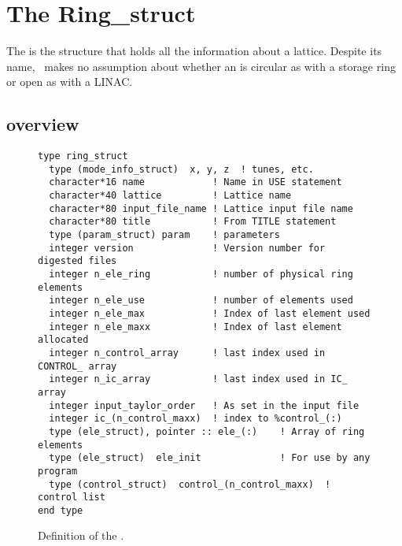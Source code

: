 \chapter{The Ring\_struct}
\label{c:ring_struct}

The  is the structure that holds all the information 
about a lattice.   Despite its name, \bmad\
makes no assumption about whether an  is circular as
with a storage ring or open as with a LINAC.

\section{overview}

\begin{figure}[tb]
\centering
\begin{verbatim}
type ring_struct
  type (mode_info_struct)  x, y, z  ! tunes, etc.
  character*16 name            ! Name in USE statement
  character*40 lattice         ! Lattice name
  character*80 input_file_name ! Lattice input file name
  character*80 title           ! From TITLE statement
  type (param_struct) param    ! parameters
  integer version              ! Version number for digested files
  integer n_ele_ring           ! number of physical ring elements
  integer n_ele_use            ! number of elements used
  integer n_ele_max            ! Index of last element used
  integer n_ele_maxx           ! Index of last element allocated
  integer n_control_array      ! last index used in CONTROL_ array
  integer n_ic_array           ! last index used in IC_ array
  integer input_taylor_order   ! As set in the input file
  integer ic_(n_control_maxx)  ! index to %control_(:)
  type (ele_struct), pointer :: ele_(:)    ! Array of ring elements
  type (ele_struct)  ele_init              ! For use by any program
  type (control_struct)  control_(n_control_maxx)  ! control list
end type
\end{verbatim}
\caption{Definition of the .}
\label{f:ring_struct}
\end{figure}

